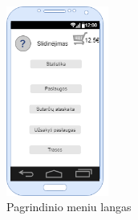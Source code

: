 \documentclass[oneside]{VUMIFPSkursinis}
\begin{document}
\begin{figure}[h]
    \centering
    \includegraphics[width=0.30\textwidth]{mainmenu.png}
    \caption{Pagrindinio meniu langas}
    \label{fig:mainmenu}
\end{figure}
\end{document}
